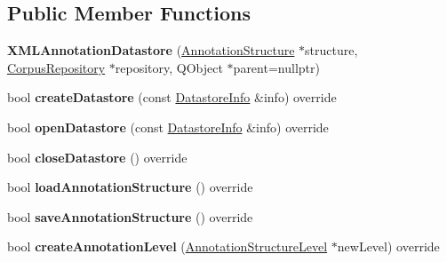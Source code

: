 \subsection*{Public Member Functions}
\begin{DoxyCompactItemize}
\item 
\mbox{\label{class_x_m_l_annotation_datastore_ad1d87eb00fb79e010a09c6c9ff3eb937}} 
{\bfseries X\+M\+L\+Annotation\+Datastore} (\hyperlink{class_annotation_structure}{Annotation\+Structure} $\ast$structure, \hyperlink{class_corpus_repository}{Corpus\+Repository} $\ast$repository, Q\+Object $\ast$parent=nullptr)
\item 
\mbox{\label{class_x_m_l_annotation_datastore_ac6c7fcd97426e1d8672ff3dcda40111b}} 
bool {\bfseries create\+Datastore} (const \hyperlink{class_datastore_info}{Datastore\+Info} \&info) override
\item 
\mbox{\label{class_x_m_l_annotation_datastore_acd45f19e95c9734edf4959cb63b75e19}} 
bool {\bfseries open\+Datastore} (const \hyperlink{class_datastore_info}{Datastore\+Info} \&info) override
\item 
\mbox{\label{class_x_m_l_annotation_datastore_a4ebdff9ce09ca8324c034c68d0cb7cf3}} 
bool {\bfseries close\+Datastore} () override
\item 
\mbox{\label{class_x_m_l_annotation_datastore_af74b6aef2d7beab046b84b2a75d82d63}} 
bool {\bfseries load\+Annotation\+Structure} () override
\item 
\mbox{\label{class_x_m_l_annotation_datastore_a77b46341e21abdae4d0498ce8b3cc3d8}} 
bool {\bfseries save\+Annotation\+Structure} () override
\item 
\mbox{\label{class_x_m_l_annotation_datastore_a5d376909b32f1101a51579b3ca9ecc27}} 
bool {\bfseries create\+Annotation\+Level} (\hyperlink{class_annotation_structure_level}{Annotation\+Structure\+Level} $\ast$new\+Level) override
\item 
\mbox{\label{class_x_m_l_annotation_datastore_ab28ae984da7be6743274baae24ff00da}} 

\end{DoxyCompactItemize}
